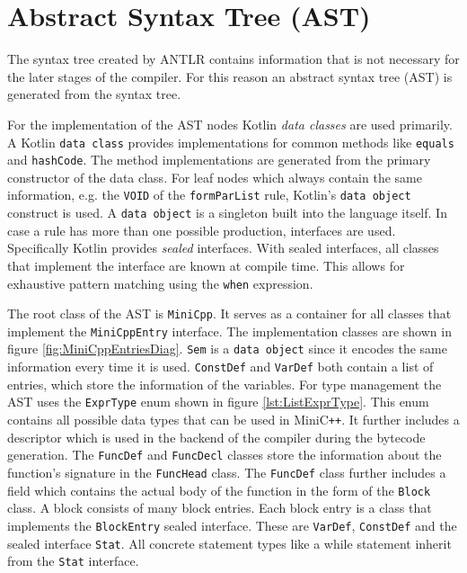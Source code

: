 \section{Abstract Syntax Tree (AST)}

The syntax tree created by ANTLR contains information that is not necessary for the later stages of the compiler. For this reason an abstract syntax tree (AST) is generated from the syntax tree. 

For the implementation of the AST nodes Kotlin \textit{data classes} are used primarily. A Kotlin \texttt{data class} provides implementations for common methods like \texttt{equals} and \verb|hashCode|. The method implementations are generated from the primary constructor of the data class. For leaf nodes which always contain the same information, e.g. the \verb|VOID| of the \verb|formParList| rule, Kotlin's \verb|data object| construct is used. A \verb|data object| is a singleton built into the language itself. In case a rule has more than one possible production, interfaces are used. Specifically Kotlin provides \textit{sealed} interfaces. With sealed interfaces, all classes that implement the interface are known at compile time. This allows for exhaustive pattern matching using the \verb|when| expression. 

The root class of the AST is \verb|MiniCpp|. It serves as a container for all classes that implement the \verb|MiniCppEntry| interface. The implementation classes are shown in figure \ref{fig:MiniCppEntriesDiag}. \verb|Sem| is a \verb|data object| since it encodes the same information every time it is used. \verb|ConstDef| and \verb|VarDef| both contain a list of entries, which store the information of the variables. For type management the AST uses the \verb|ExprType| enum shown in figure \ref{lst:ListExprType}. This enum contains all possible data types that can be used in MiniC\verb|++|. It further includes a descriptor which is used in the backend of the compiler during the bytecode generation. The \verb|FuncDef| and \verb|FuncDecl| classes store the information about the function's signature in the \verb|FuncHead| class. The  \verb|FuncDef| class further includes a field which contains the actual body of the function in the form of the \texttt{Block} class. A block consists of many block entries. Each block entry is a class that implements the \verb|BlockEntry| sealed interface. These are \verb|VarDef|, \verb|ConstDef| and the sealed interface \verb|Stat|. All concrete statement types like a while statement inherit from the \verb|Stat| interface. 


